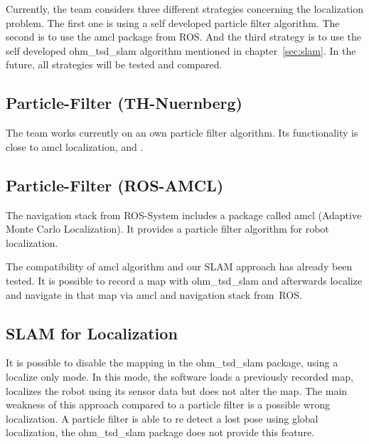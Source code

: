 
Currently, the team considers three different strategies concerning the localization problem. The first one is using a self developed particle filter algorithm. The second is to use the amcl package from ROS. And the third strategy is to use the self developed ohm\_tsd\_slam algorithm mentioned in chapter~\ref{sec:slam}. In the future, all strategies will be tested and compared.

\subsection{Particle-Filter (TH-Nuernberg)}
The team works currently on an own particle filter algorithm. Its functionality is close to amcl localization, \cite{pf_fox} and \cite{pr}. 

\subsection{Particle-Filter (ROS-AMCL)}
The navigation stack from ROS-System includes a package called amcl (Adaptive Monte Carlo Localization). It provides a particle filter algorithm for robot localization. 

The compatibility of amcl algorithm and our SLAM approach has already been tested. It is possible to record a map with ohm\_tsd\_slam and afterwards localize and navigate in that map via amcl and navigation stack from~ROS.

\subsection{SLAM for Localization}
It is possible to disable the mapping in the ohm\_tsd\_slam package, using a localize only mode. In this mode, the software loads a previously recorded map, localizes the robot using its sensor data but does not alter the map. The main weakness of this approach compared to a particle filter is a possible wrong localization. A particle filter is able to re detect a lost pose using global localization, the ohm\_tsd\_slam package does not provide this feature.

